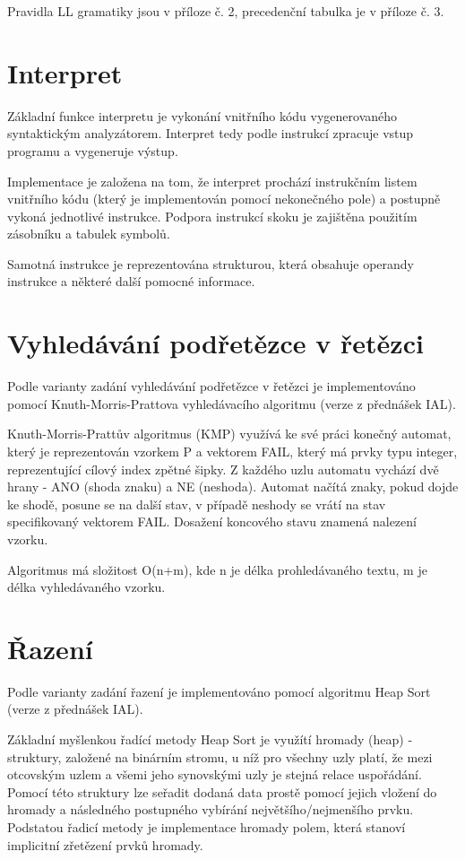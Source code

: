 \documentclass[12pt,a4paper,titlepage,final]{report}
\begin{document}
Pravidla LL gramatiky jsou v příloze č. 2, precedenční tabulka je v příloze č. 3.

\section{Interpret}
Základní funkce interpretu je vykonání vnitřního kódu vygenerovaného syntaktickým analyzátorem. Interpret tedy podle instrukcí zpracuje vstup programu a vygeneruje výstup.

Implementace je založena na tom, že interpret prochází instrukčním listem vnitřního kódu (který je implementován pomocí nekonečného pole) a postupně vykoná jednotlivé instrukce. Podpora instrukcí skoku je zajištěna použitím zásobníku a tabulek symbolů.

Samotná instrukce je reprezentována strukturou, která obsahuje operandy instrukce a některé další pomocné informace.

\section{Vyhledávání podřetězce v řetězci}
Podle varianty zadání vyhledávání podřetězce v řetězci je implementováno pomocí Knuth-Morris-Prattova vyhledávacího algoritmu (verze z přednášek IAL).

Knuth-Morris-Prattův algoritmus (KMP) využívá ke své práci konečný automat, který je reprezentován vzorkem P a vektorem FAIL, který má prvky typu integer, reprezentující cílový index zpětné šipky. Z každého uzlu automatu vychází dvě hrany - ANO (shoda znaku) a NE (neshoda). Automat načítá znaky, pokud dojde ke shodě, posune se na další stav, v případě neshody se vrátí na stav specifikovaný vektorem FAIL. Dosažení koncového stavu znamená nalezení vzorku.

Algoritmus má složitost O(n+m), kde n je délka prohledávaného textu, m je délka vyhledávaného vzorku.

\section{Řazení}
Podle varianty zadání řazení je implementováno pomocí algoritmu Heap Sort (verze z přednášek IAL).

Základní myšlenkou řadící metody Heap Sort je využítí hromady (heap) - struktury, založené na binárním stromu, u níž pro všechny uzly platí, že mezi otcovským uzlem a všemi jeho synovskými uzly je stejná relace uspořádání. Pomocí této struktury lze seřadit dodaná data prostě pomocí jejich vložení do hromady a následného postupného vybírání největšího/nejmenšího prvku. Podstatou řadicí metody je implementace hromady polem, která stanoví implicitní zřetězení prvků hromady.
\end{document}
